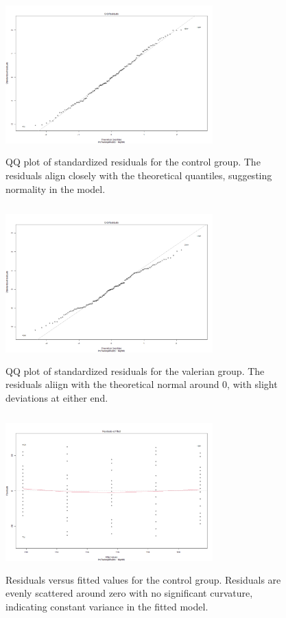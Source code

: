 \documentclass[10pt,preprintnumbers,amsmath,amssymb,floatfix,twocolumn,prl]{revtex4-2}
\begin{document}
\begin{figure}
\centering
\includegraphics[width = 8cm, height = 6cm]{QQ_control.png}
\caption{QQ plot of standardized residuals for the control group. The residuals align closely with the theoretical quantiles, suggesting normality in the model.}
\end{figure}

\begin{figure}
\centering
\includegraphics[width = 8cm, height = 6cm]{QQ_valerian.png}
\caption{QQ plot of standardized residuals for the valerian group. The residuals aliign with the theoretical normal around 0, with slight deviations at either end.}
\end{figure}

\begin{figure}
\centering
\includegraphics[width = 8cm, height = 6cm]{residual_fitted_control.png}
\caption{Residuals versus fitted values for the control group. Residuals are evenly scattered around zero with no significant curvature, indicating constant variance in the fitted model.}
\end{figure}
\end{document}
